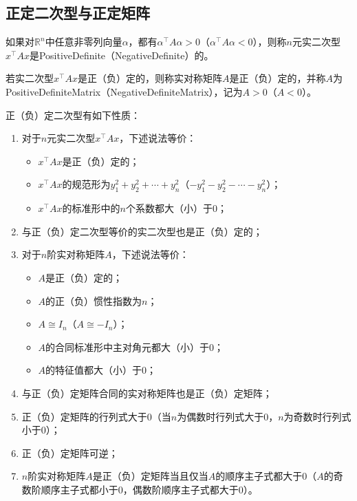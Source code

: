 \subsection{正定二次型与正定矩阵}
\begin{definition}
	如果对$\mathbb{R}^{n}$中任意非零列向量$\alpha$，都有$\alpha^{\top}A\alpha>0$（$\alpha^{\top}A\alpha<0$），则称$n$元实二次型$x^{\top}Ax$是\gls{PositiveDefinite}（\gls{NegativeDefinite}）的。
\end{definition}
\begin{definition}
	若实二次型$x^{\top}Ax$是正（负）定的，则称实对称矩阵$A$是正（负）定的，并称$A$为\gls{PositiveDefiniteMatrix}（\gls{NegativeDefiniteMatrix}），记为$A>0$（$A<0$）。
\end{definition}
\begin{theorem}\label{theo:PositiveDefinite}
	正（负）定二次型有如下性质：
	\begin{enumerate}
		\item 对于$n$元实二次型$x^{\top}Ax$，下述说法等价：
		\begin{itemize}
			\item $x^{\top}Ax$是正（负）定的；
			\item $x^{\top}Ax$的规范形为$y_1^2+y_2^2+\cdots+y_n^2$（$-y_1^2-y_2^2-\cdots-y_n^2$）；
			\item $x^{\top}Ax$的标准形中的$n$个系数都大（小）于$0$；
		\end{itemize}
		\item 与正（负）定二次型等价的实二次型也是正（负）定的；
		\item 对于$n$阶实对称矩阵$A$，下述说法等价：
		\begin{itemize}
			\item $A$是正（负）定的；
			\item $A$的正（负）惯性指数为$n$；
			\item $A\cong I_n$（$A\cong -I_n$）；
			\item $A$的合同标准形中主对角元都大（小）于$0$；
			\item $A$的特征值都大（小）于$0$；
		\end{itemize}
		\item 与正（负）定矩阵合同的实对称矩阵也是正（负）定矩阵；
		\item 正（负）定矩阵的行列式大于$0$（当$n$为偶数时行列式大于$0$，$n$为奇数时行列式小于$0$）；
		\item 正（负）定矩阵可逆；
		\item $n$阶实对称矩阵$A$是正（负）定矩阵当且仅当$A$的顺序主子式都大于$0$（$A$的奇数阶顺序主子式都小于$0$，偶数阶顺序主子式都大于$0$）。
	\end{enumerate}
\end{theorem}
